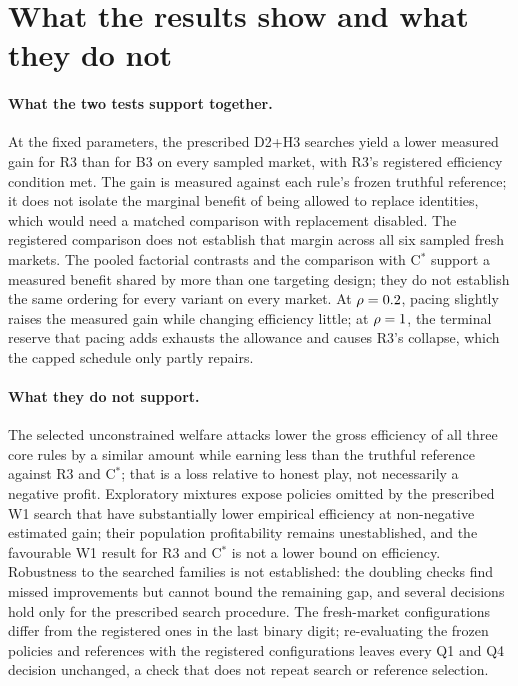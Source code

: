 \documentclass[11pt]{article}
\begin{document}
\clearpage

\section{What the results show and what they do not}\label{sec:discussion}
\paragraph{What the two tests support together.} At the fixed parameters, the prescribed D2+H3 searches yield a lower measured gain for R3 than for B3 on every sampled market, with R3's registered efficiency condition met. The gain is measured against each rule's frozen truthful reference; it does not isolate the marginal benefit of being allowed to replace identities, which would need a matched comparison with replacement disabled. The registered comparison does not establish that margin across all six sampled fresh markets. The pooled factorial contrasts and the comparison with C$^*$ support a measured benefit shared by more than one targeting design; they do not establish the same ordering for every variant on every market. At $\rho = 0.2$, pacing slightly raises the measured gain while changing efficiency little; at $\rho = 1$, the terminal reserve that pacing adds exhausts the allowance and causes R3's collapse, which the capped schedule only partly repairs.

\paragraph{What they do not support.} The selected unconstrained welfare attacks lower the gross efficiency of all three core rules by a similar amount while earning less than the truthful reference against R3 and C$^*$; that is a loss relative to honest play, not necessarily a negative profit. Exploratory mixtures expose policies omitted by the prescribed W1 search that have substantially lower empirical efficiency at non-negative estimated gain; their population profitability remains unestablished, and the favourable W1 result for R3 and C$^*$ is not a lower bound on efficiency. Robustness to the searched families is not established: the doubling checks find missed improvements but cannot bound the remaining gap, and several decisions hold only for the prescribed search procedure. The fresh-market configurations differ from the registered ones in the last binary digit; re-evaluating the frozen policies and references with the registered configurations leaves every Q1 and Q4 decision unchanged, a check that does not repeat search or reference selection.
\end{document}

